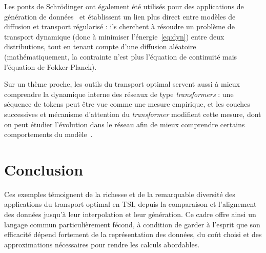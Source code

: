 \documentclass[11pt,a4paper]{article}
\begin{document}
Les ponts de Schrödinger ont également été utilisés pour des applications de génération de données~\cite{DeBortoli2021} et établissent un lien plus direct entre modèles de diffusion et transport régularisé : ils cherchent à résoudre un problème de transport dynamique (donc à minimiser l'énergie~\ref{eq:dyn}) entre deux distributions, tout en tenant compte d’une diffusion aléatoire (mathématiquement, la contrainte n'est plus l'équation de continuité mais l'équation de Fokker-Planck). %

Sur un thème proche, les outils du transport optimal servent aussi à mieux comprendre la dynamique interne des réseaux de type
{\em transformers} : une séquence de tokens peut être vue comme une mesure empirique, et les couches successives et mécanisme d'attention du {\em transformer} modifient cette mesure, dont on peut étudier l'évolution dans le réseau afin de mieux comprendre certains comportements du modèle~\cite{Castin2025Transformers,Peyre2025OTML}.



\section*{Conclusion}

Ces exemples témoignent de la richesse et de la remarquable diversité des applications du transport optimal en TSI, depuis la comparaison et l’alignement des données jusqu’à leur interpolation et leur génération. Ce cadre offre ainsi un langage commun particulièrement fécond, à condition de garder à l’esprit que son efficacité dépend fortement de la représentation des données, du coût choisi et des approximations nécessaires pour rendre les calculs abordables.



\end{document}
